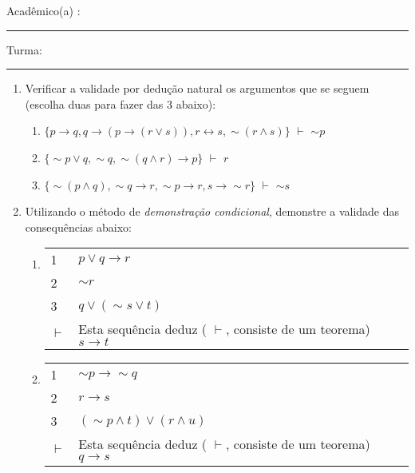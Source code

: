 \documentclass[12pt, a4paper,final]{article}
\begin{document}


\vskip 0.5cm Acad\^emico(a) : \rule{10cm}{0.4pt} Turma:  \rule{1cm}{0.4pt}
\noindent
\begin{enumerate}
\setlength{\itemsep}{-1pt}

\item Verificar a validade por dedu\c c\~ao natural os argumentos que se seguem (escolha duas para fazer das 3 abaixo):

\begin{enumerate}
\setlength{\itemsep}{-2pt} 

 \item $\{ p \rightarrow q, q \rightarrow (p \rightarrow (r \vee s)), r \leftrightarrow s, \sim (r \wedge s) \}$ {\bf $\vdash $} $\sim p$

\item $\{ \sim p \vee q, \sim q, \sim (q \wedge r) \rightarrow p \}$  {\bf $\vdash $} $r$

\item $\{\sim (p \wedge q), \sim q \rightarrow r, \sim p \rightarrow r, s \rightarrow\sim r \}$  {\bf $\vdash $} $\sim s$
\end{enumerate}


 \item Utilizando o m\'etodo de {\em demonstra\c c\~ao condicional}, demonstre a validade das consequ\^encias abaixo:
  
\begin{enumerate}
\setlength{\itemsep}{-4pt} 
\item
 \vskip 11pt
 \begin{tabular}{ll}  %
 1 &  $  p \vee q \rightarrow r $ \\    
 2 & $ \sim r$ \\   
  3 &  $ q \vee (\sim s \vee t)$ \\ \hline
      $\vdash $ & Esta sequ\^encia deduz ( $\vdash $, consiste de um teorema) $ s \rightarrow t$
   
\end{tabular}
\item 
\vskip 11pt
\begin{tabular}{ll}  
    1 &  $ \sim p \rightarrow \sim q $ \\   
    2 &  $ r \rightarrow s$ \\   
     3 &  $ (\sim p \wedge t) \vee (r \wedge u)$ \\ \hline
    $\vdash $  & Esta sequ\^encia deduz ( $\vdash $, consiste de um teorema) $ q \rightarrow s $\end{tabular}
\end{enumerate}


\end{enumerate}
\end{document}
